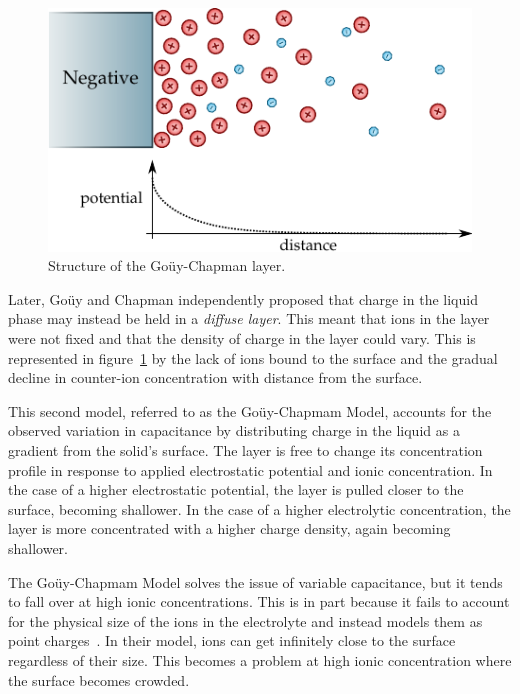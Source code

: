     \begin{figure}
      \begin{center}
        \includegraphics{content/introduction/graphics/model_guoyChapman}
      \end{center}
      \caption{Structure of the Goüy-Chapman layer.}
      \label{fig:doubleLayerModel_gouyChapman}
    \end{figure}

    Later, Goüy and Chapman independently proposed that charge in the liquid phase may instead be held in a \emph{diffuse layer}.
    This meant that ions in the layer were not fixed and that the density of charge in the layer could vary.
    This is represented in figure~\ref{fig:doubleLayerModel_gouyChapman} by the lack of ions bound to the surface and the gradual decline in counter-ion concentration with distance from the surface.

    This second model, referred to as the Goüy-Chapmam Model, accounts for the observed variation in capacitance by distributing charge in the liquid as a gradient from the solid's surface.
    The layer is free to change its concentration profile in response to applied electrostatic potential and ionic concentration.
    In the case of a higher electrostatic potential, the layer is pulled closer to the surface, becoming shallower.
    In the case of a higher electrolytic concentration, the layer is more concentrated with a higher charge density, again becoming shallower.

    The Goüy-Chapmam Model solves the issue of variable capacitance, but it tends to fall over at high ionic concentrations.
    This is in part because it fails to account for the physical size of the ions in the electrolyte and instead models them as point charges~\cite{Bard1980}.
    In their model, ions can get infinitely close to the surface regardless of their size.
    This becomes a problem at high ionic concentration where the surface becomes crowded.

